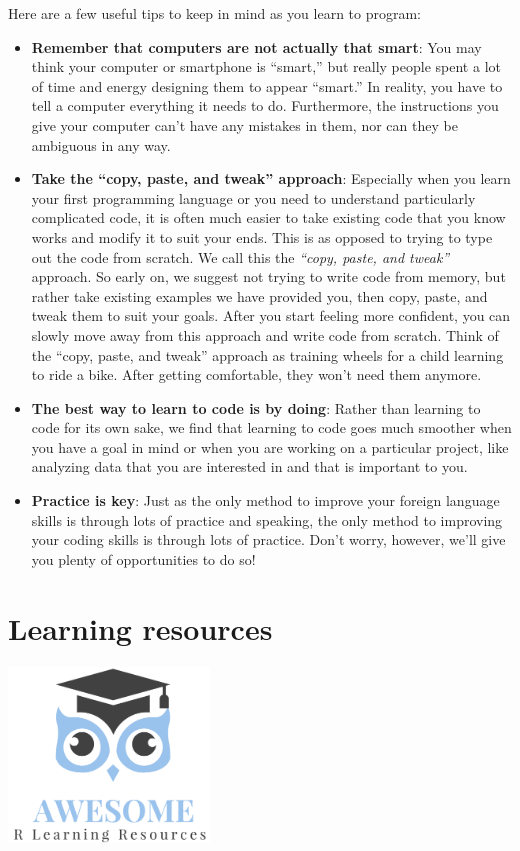\documentclass[
  12pt,
  oneside]{book}
\providecommand{\tightlist}{%
  \setlength{\itemsep}{0pt}\setlength{\parskip}{0pt}}
\begin{document}
Here are a few useful tips to keep in mind as you learn to program:

\begin{itemize}
\tightlist
\item
  \textbf{Remember that computers are not actually that smart}: You may think your computer or smartphone is ``smart,'' but really people spent a lot of time and energy designing them to appear ``smart.'' In reality, you have to tell a computer everything it needs to do. Furthermore, the instructions you give your computer can't have any mistakes in them, nor can they be ambiguous in any way.
\item
  \textbf{Take the ``copy, paste, and tweak'' approach}: Especially when you learn your first programming language or you need to understand particularly complicated code, it is often much easier to take existing code that you know works and modify it to suit your ends. This is as opposed to trying to type out the code from scratch. We call this the \emph{``copy, paste, and tweak''} approach. So early on, we suggest not trying to write code from memory, but rather take existing examples we have provided you, then copy, paste, and tweak them to suit your goals. After you start feeling more confident, you can slowly move away from this approach and write code from scratch. Think of the ``copy, paste, and tweak'' approach as training wheels for a child learning to ride a bike. After getting comfortable, they won't need them anymore.
\item
  \textbf{The best way to learn to code is by doing}: Rather than learning to code for its own sake, we find that learning to code goes much smoother when you have a goal in mind or when you are working on a particular project, like analyzing data that you are interested in and that is important to you.
\item
  \textbf{Practice is key}: Just as the only method to improve your foreign language skills is through lots of practice and speaking, the only method to improving your coding skills is through lots of practice. Don't worry, however, we'll give you plenty of opportunities to do so!
\end{itemize}

\hypertarget{Rlearninglit}{%
\section{Learning resources}\label{Rlearninglit}}

\includegraphics[width=0.4\textwidth,height=\textheight]{fig/aweres.png}
\end{document}
